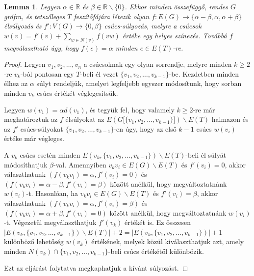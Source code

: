 \documentclass[12pt, a4paper]{report}
\newtheorem{lem}[tét]{Lemma}
\theoremstyle{remark}
\theoremstyle{definition}
\begin{document}
\begin{lem} \label{lem:6treemixed}
Legyen $\alpha \in \mathbb{R}$ és $\beta \in \mathbb{R} \smallsetminus \lbrace 0 \rbrace$. Ekkor minden összefüggő, rendes $G$ gráfra, és tetszőleges $T$ feszítőfájára létezik olyan $f:E(G) \rightarrow \lbrace \alpha - \beta, \alpha, \alpha + \beta \rbrace$ élsúlyozás és $f':V(G) \rightarrow \lbrace 0, \beta \rbrace$ csúcs-súlyozás, melyre a csúcsok $w(v) = f'(v) + \sum\limits_{w \in N(v)} f(vw)$ értéke egy helyes színezés. Továbbá $f$ megválasztható úgy, hogy $f(e) = \alpha$ minden $e \in E(T)$-re.
\end{lem}

\begin{proof}
Legyen $v_1, v_2, \ldots, v_n$ a csúcsoknak egy olyan sorrendje, melyre minden $k \geq 2$-re $v_k$-ból pontosan egy $T$-beli él vezet $\lbrace v_1, v_2, \ldots, v_{k - 1} \rbrace$-be. Kezdetben minden élhez az $\alpha$ súlyt rendeljük, amelyet legfeljebb egyszer módosítunk, hogy sorban minden $v_k$ csúcs értékét véglegesítsük.

Legyen $w(v_1) = \alpha d(v_1)$, és tegyük fel, hogy valamely $k \geq 2$-re már meghatároztuk az $f$ élsúlyokat az $E(G\lbrack \lbrace v_1, v_2, \ldots, v_{k - 1} \rbrace \rbrack) \smallsetminus E(T)$ halmazon és az $f'$ csúcs-súlyokat $\lbrace v_1, v_2, \ldots, v_{k - 1} \rbrace$-en úgy, hogy az első $k - 1$ csúcs $w(v_i)$ értéke már végleges.

A $v_k$ csúcs esetén minden $E(v_k, \lbrace v_1, v_2, \ldots, v_{k - 1} \rbrace) \smallsetminus E(T)$-beli él súlyát módosíthatjuk $\beta$-val. Amennyiben $v_k v_i \in E(G) \smallsetminus E(T)$ és $f'(v_i) = 0$, akkor választhatunk $(f(v_k v_i) = \alpha, f'(v_i) = 0)$ és $(f(v_k v_i) = \alpha - \beta, f'(v_i) = \beta)$ között anélkül, hogy megváltoztatnánk $w(v_i)$-t. Hasonlóan, ha $v_k v_i \in E(G) \smallsetminus E(T)$ és $f'(v_i) = \beta$, akkor választhatunk $(f(v_k v_i) = \alpha, f'(v_i) = \beta)$ és $(f(v_k v_i) = \alpha + \beta, f'(v_i) = 0)$ között anélkül, hogy megváltoztatnánk $w(v_i)$-t. Végezetül megválaszthatjuk $f'(v_k)$ értékét is. Ez összesen $|E(v_k, \lbrace v_1, v_2, \ldots, v_{k - 1} \rbrace) \smallsetminus E(T)| + 2 = |E(v_k, \lbrace v_1, v_2, \ldots, v_{k - 1} \rbrace)| + 1$ különböző lehetőség $w(v_k)$ értékének, melyek közül kiválaszthatjuk azt, amely minden $N(v_k) \cap \lbrace v_1, v_2, \ldots, v_{k - 1} \rbrace$-beli csúcs értékétől különbözik.

Ezt az eljárást folytatva megkaphatjuk a kívánt súlyozást.
\end{proof}
\end{document}
